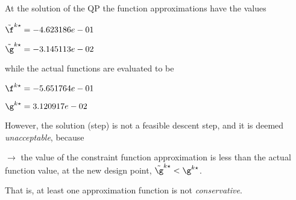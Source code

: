 At the solution of the QP the function approximations have the values

$\tilde \f^{k\star} = -4.623186e-01$

$\tilde \g^{k\star} = -3.145113e-02$

\bigskip
while the actual functions are evaluated to be

$\f^{k\star} = -5.651764e-01$

$\g^{k\star} =  3.120917e-02$

\bigskip
 However, the solution (step)                         is not a feasible descent step, and it is deemed                         \emph{unacceptable}, because 
 


 $\to$ the value of the constraint function                             approximation is less than the actual function value, at                             the new design point, $\tilde {\g}^{k\star} < {\g}^{k\star}$.

 \bigskip 

 That is, at least one approximation                         function is not \emph{conservative}.

